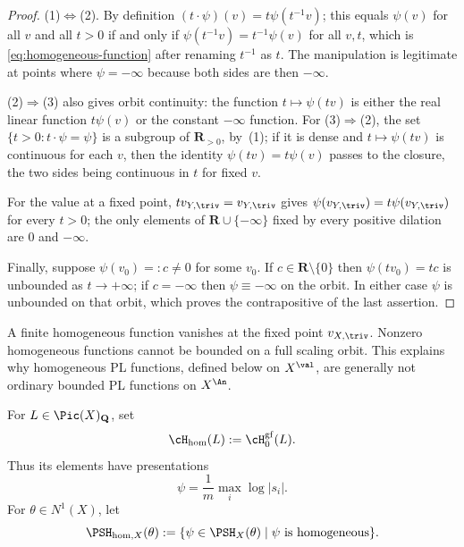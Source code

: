 \begin{proof}
(1)$\Leftrightarrow$(2).  By definition
$(t\cdot\psi)(v)=t\psi(t^{-1}v)$; this equals $\psi(v)$ for all $v$ and
all $t>0$ if and only if $\psi(t^{-1}v)=t^{-1}\psi(v)$ for all $v,t$,
which is \eqref{eq:homogeneous-function} after renaming $t^{-1}$ as
$t$.  The manipulation is legitimate at points where $\psi=-\infty$
because both sides are then $-\infty$.

(2)$\Rightarrow$(3) also gives orbit continuity: the function
$t\mapsto\psi(tv)$ is either the real linear function $t\psi(v)$
or the constant $-\infty$ function.  For (3)$\Rightarrow$(2), the set
$\{t>0:t\cdot\psi=\psi\}$ is a subgroup of $\mathbf R_{>0}$, by
\,(1); if it is dense and
$t\mapsto\psi(tv)$ is continuous for each $v$, then the identity
$\psi(tv)=t\psi(v)$ passes to the closure, the two sides being continuous
in $t$ for fixed $v$.

For the value at a fixed point, $tv_{Y,\triv}=v_{Y,\triv}$ gives
$\psi(v_{Y,\triv})=t\psi(v_{Y,\triv})$ for every $t>0$; the only
elements of $\mathbf R\cup\{-\infty\}$ fixed by every positive dilation are
$0$ and $-\infty$.

Finally, suppose $\psi(v_0)=:c\neq0$ for some $v_0$.  If
$c\in\mathbf R\setminus\{0\}$ then $\psi(tv_0)=tc$ is unbounded as
$t\to+\infty$; if $c=-\infty$ then $\psi\equiv-\infty$ on the orbit.
In either case $\psi$ is unbounded on that orbit, which proves the
contrapositive of the last assertion.
\end{proof}

A finite homogeneous function vanishes at the fixed point
$v_{X,\triv}$.  Nonzero homogeneous functions cannot be bounded on a full
scaling orbit.  This explains why homogeneous PL functions, defined below
on $X^{\val}$, are generally not ordinary bounded PL functions on
$X^{\An}$.

\begin{definition}
\label{def:homogeneous-fs-psh}
For $L\in\Pic(X)_{\mathbf Q}$, set
\[
 \cH_{\mathrm{hom}}(L):=\cH^{\mathrm{gf}}_0(L).
\]
Thus its elements have presentations
\begin{equation}
\label{eq:homogeneous-fs-presentation}
                  \psi=\frac1m\max_i\log|s_i|.
\end{equation}
For $\theta\in N^1(X)$, let
\begin{equation}
\label{eq:homogeneous-psh-space}
 \PSH_{\mathrm{hom},X}(\theta)
 :=\{\psi\in\PSH_X(\theta)\mid\psi\text{ is homogeneous}\}.
\end{equation}
\end{definition}

